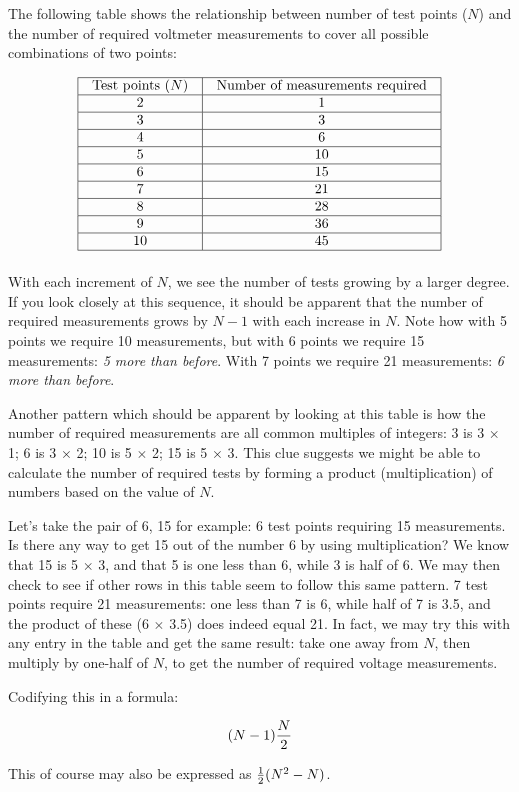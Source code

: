 The following table shows the relationship between number of test points ($N$) and the number of required voltmeter measurements to cover all possible combinations of two points:


$$\vbox{\offinterlineskip
\halign{\strut
\vrule \quad\hfil # \ \hfil & 
\vrule \quad\hfil # \ \hfil \vrule \cr
\noalign{\hrule}
%
Test points ($N$) & Number of measurements required \cr
%
\noalign{\hrule}
%
2 & 1 \cr
%
\noalign{\hrule}
%
3 & 3 \cr
%
\noalign{\hrule}
%
4 & 6 \cr
%
\noalign{\hrule}
%
5 & 10 \cr
%
\noalign{\hrule}
%
6 & 15 \cr
%
\noalign{\hrule}
%
7 & 21 \cr
%
\noalign{\hrule}
%
8 & 28 \cr
%
\noalign{\hrule}
%
9 & 36 \cr
%
\noalign{\hrule}
%
10 & 45 \cr
%
\noalign{\hrule}
} %
}$$ %

With each increment of $N$, we see the number of tests growing by a larger degree.  If you look closely at this sequence, it should be apparent that the number of required measurements grows by $N-1$ with each increase in $N$.  Note how with 5 points we require 10 measurements, but with 6 points we require 15 measurements: {\it 5 more than before}.  With 7 points we require 21 measurements: {\it 6 more than before}.

Another pattern which should be apparent by looking at this table is how the number of required measurements are all common multiples of integers: 3 is 3 $\times$ 1; 6 is 3 $\times$ 2; 10 is 5 $\times$ 2; 15 is 5 $\times$ 3.  This clue suggests we might be able to calculate the number of required tests by forming a product (multiplication) of numbers based on the value of $N$.

Let's take the pair of 6, 15 for example: 6 test points requiring 15 measurements.  Is there any way to get 15 out of the number 6 by using multiplication?  We know that 15 is 5 $\times$ 3, and that 5 is one less than 6, while 3 is half of 6.  We may then check to see if other rows in this table seem to follow this same pattern.  7 test points require 21 measurements: one less than 7 is 6, while half of 7 is 3.5, and the product of these (6 $\times$ 3.5) does indeed equal 21.  In fact, we may try this with any entry in the table and get the same result: take one away from $N$, then multiply by one-half of $N$, to get the number of required voltage measurements.

Codifying this in a formula:

$$(N-1){N \over 2}$$

This of course may also be expressed as ${1 \over 2}(N^2 - N)$.




